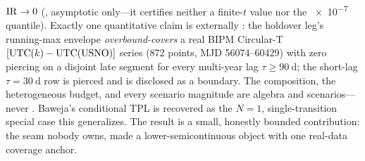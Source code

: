 $\mathrm{IR}\to0$ (\Proven{}, asymptotic only---it certifies neither a finite-$t$ value
nor the \num{e-7} quantile). Exactly one quantitative claim is externally
\Validated{}: the holdover leg's running-max envelope \emph{overbound-covers} a
real BIPM Circular-T $[\mathrm{UTC}(k){}-\mathrm{UTC(USNO)}]$ series (872 points, MJD
56074--60429) with zero piercing on a disjoint late segment for every multi-year
lag $\tau\ge\SI{90}{\day}$; the short-lag $\tau=\SI{30}{\day}$ row is pierced and
is disclosed as a \Modelled{} boundary. The composition, the heterogeneous
budget, and every scenario magnitude are \Proven{} algebra and \Modelled{}
scenarios---never \Validated{}. Baweja's conditional TPL is recovered as the
$N=1$, single-transition special case this generalizes. The result is a small,
honestly bounded contribution: the seam nobody owns, made a lower-semicontinuous
object with one real-data coverage anchor.
